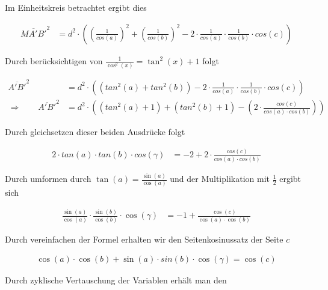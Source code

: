 \begin{refsection}
Im Einheitskreis betrachtet ergibt dies

\begin{align*}
\overline{ MA'B' }^{ 2 } &= d^{ 2 } \cdot \left(\left(\frac{ 1 }{ cos(a) }  \right)^{ 2 } + \left(\frac{ 1 }{ cos(b) }  \right)^{ 2 } - 2 \cdot \frac{ 1 }{ cos(a)} \cdot \frac{ 1 }{ cos(b)} \cdot cos(c)\right)
\end{align*}


Durch berücksichtigen von $\frac{1}{\cos^{2}(x)}=\tan^{2}(x)+1$ folgt

\begin{align*}
\overline{ A'B'}^{ 2 } &= d^{ 2 } \cdot \left(\left(tan^{ 2 }(a) + tan^{ 2 }(b)\right) - 2 \cdot \frac{ 1 }{ cos(a)} \cdot \frac{ 1 }{ cos(b)} \cdot cos(c)\right) \\
\Rightarrow \quad \quad
\overline{ A'B'}^{ 2 } &= d^{ 2 } \cdot \left(\left(tan^{ 2 }(a) + 1\right) + \left(tan^{ 2 }(b) + 1\right) - \left(2 \cdot \frac{cos(c)}{cos(a) \cdot cos(b)}\right)\right)
\end{align*}


Durch gleichsetzen dieser beiden Ausdrücke folgt

\begin{align*}
2 \cdot tan(a) \cdot tan(b) \cdot cos(\gamma) &= -2+2 \cdot \frac{cos(c)}{cos(a) \cdot cos(b)}
\end{align*}

Durch umformen durch $\tan(a)=\frac{\sin(a)}{\cos(a)}$ und der Multiplikation mit  $\frac{1}{2}$ ergibt sich

\begin{align*}
\frac{\sin(a)}{\cos(a)} \cdot \frac{\sin(b)}{\cos(b)} \cdot \cos(\gamma) &= -1 + \frac{\cos(c)}{\cos(a) \cdot \cos(b)}
\end{align*}

Durch vereinfachen der Formel erhalten wir den Seitenkosinussatz der Seite $c$

\begin{align*}
\cos(a) \cdot \cos(b) + \sin(a) \cdot sin(b) \cdot \cos(\gamma) = \cos(c)
\end{align*}

Durch zyklische Vertauschung der Variablen erhält man den 

\begin{satz}
\label{skript:kugel:satz:Seitenkosinussatz}
\end{satz}



\end{refsection}
